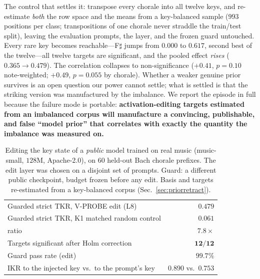 \documentclass[conference]{IEEEtran}
\makeatletter
\newcommand{\tkr}{\mathrm{TKR}}
\newcommand{\ikr}{\mathrm{IKR}}
\newcommand{\vs}{vs.\@\ }
\makeatother
\begin{document}
The control that settles it: transpose every chorale into all twelve keys, and
re-estimate \emph{both} the row space and the means from a key-balanced sample
($993$ positions per class; transpositions of one chorale never straddle the
train/test split), leaving the evaluation prompts, the layer, and the frozen guard
untouched. Every rare key becomes reachable---F$\sharp$ jumps from $0.000$ to
$0.617$, second best of the twelve---all twelve targets are significant, and the
pooled effect \emph{rises} ($0.365\to0.479$). The correlation collapses to
non-significance ($+0.41$, $p=0.10$ note-weighted; $+0.49$, $p=0.055$ by chorale).
Whether a weaker genuine prior survives is an open question our power cannot
settle; what is settled is that the striking version was manufactured by the
imbalance. We report the episode in full because the failure mode is portable:
\textbf{activation-editing targets estimated from an imbalanced corpus will
manufacture a convincing, publishable, and false ``model prior'' that correlates
with exactly the quantity the imbalance was measured on.}

\begin{table}[t]
\setlength{\tabcolsep}{4pt}\renewcommand{\arraystretch}{1.15}
\centering\small
\caption{Editing the key state of a \emph{public} model trained on real music
(music-small, $128$M, Apache-2.0), on $60$ held-out Bach chorale prefixes. The edit layer
was chosen on a disjoint set of prompts. Guard: a different public checkpoint, budget
frozen before any edit. Basis and targets re-estimated from a key-balanced corpus
(Sec.~\ref{sec:priorretract}).}
\label{tab:wildcausal}
\begin{tabularx}{\linewidth}{@{}Xr@{}}
\toprule
Guarded strict $\tkr$, V-PROBE edit (L$8$) & $\mathbf{0.479}$\\
Guarded strict $\tkr$, K1 matched random control & $0.061$\\
\quad ratio & $7.8\times$\\
\midrule
Targets significant after Holm correction & $\mathbf{12/12}$\\
Guard pass rate (edit) & $99.7\%$\\
$\ikr$ to the injected key \vs to the prompt's key & $0.890$ \vs $0.753$\\
\bottomrule
\end{tabularx}
\end{table}
\end{document}
